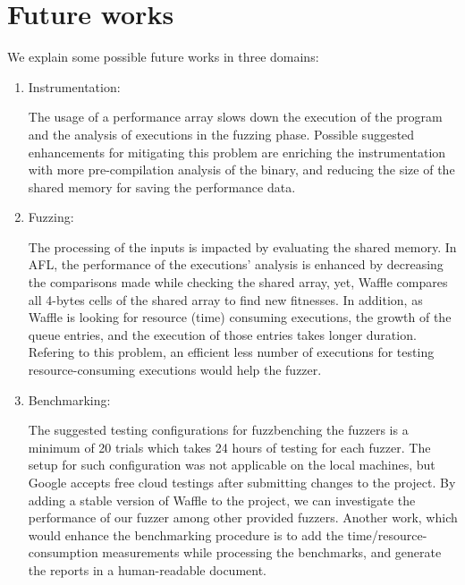 \section{Future works}
\label{sec:future-work}

We explain some possible future works in three domains:

\begin{enumerate}
    \item Instrumentation:

        The usage of a performance array slows down the execution of the program and the analysis of executions in the fuzzing phase. Possible suggested enhancements for mitigating this problem are enriching the instrumentation with more pre-compilation analysis of the binary, and reducing the size of the shared memory for saving the performance data.
        
    \item Fuzzing:
    
        The processing of the inputs is impacted by evaluating the shared memory. In AFL, the performance of the executions' analysis is enhanced by decreasing the comparisons made while checking the shared array, yet, Waffle compares all 4-bytes cells of the shared array to find new fitnesses. In addition, as Waffle is looking for resource (time) consuming executions, the growth of the queue entries, and the execution of those entries takes longer duration. Refering to this problem, an efficient less number of executions for testing resource-consuming executions would help the fuzzer. 

    \item Benchmarking:
        
        The suggested testing configurations for fuzzbenching the fuzzers is a minimum of 20 trials which takes 24 hours of testing for each fuzzer. The setup for such configuration was not applicable on the local machines, but Google accepts free cloud testings after submitting changes to the project. By adding a stable version of Waffle to the project, we can investigate the performance of our fuzzer among other provided fuzzers. Another work, which would enhance the benchmarking procedure is to add the time/resource-consumption measurements while processing the benchmarks, and generate the reports in a human-readable document.
\end{enumerate}